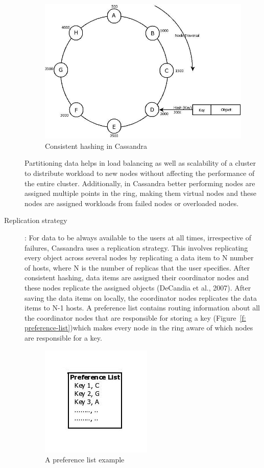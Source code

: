 \begin{description}
\begin{figure}[h]
	\centering
	\includegraphics[width=.6\textwidth]{./figure/Cassandra/Consistent-hashing-Cassandra.png}
	\caption{Consistent hashing in Cassandra}\label{f:consistent hashing}
\end{figure}

Partitioning data helps in load balancing as well as scalability of a cluster to
distribute workload to new nodes without affecting the performance of the
entire cluster. Additionally, in Cassandra better performing nodes are assigned
multiple points in the ring, making them virtual nodes and these nodes are assigned
  workloads from failed nodes or overloaded nodes. 

  \item  [Replication strategy]: For data to be always available to
  the users at all times, irrespective of failures, Cassandra uses a
  replication strategy. This involves replicating every object
  across several nodes by replicating a data item to N number of hosts, where N
  is the number of replicas that the user specifies. After consistent
  hashing, data items are assigned their coordinator nodes and these  nodes
  replicate the assigned objects (DeCandia et al., 2007). After saving the data
  items on locally, the coordinator nodes replicates the data items to N-1
  hosts. A preference list contains routing information about all the
  coordinator nodes that are responsible for storing a key (Figure~\ref{f:
  preference-list})which makes every node in the ring aware of which nodes are
  responsible for a key.
 
\begin{figure}[h]
	\centering
	\includegraphics[width=.4\textwidth]{./figure/Cassandra/Preference-list.png}
	\caption{A preference list example}\label{f: preference-list}
\end{figure}


\end{description}
